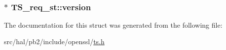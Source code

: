 \subsubsection[{\texorpdfstring{version}{version}}]{$\ast$ T\+S\+\_\+req\+\_\+st\+::version}\hypertarget{struct_t_s__req__st_aa404dd344baaf8d45b951fb6818e0ea6}{}\label{struct_t_s__req__st_aa404dd344baaf8d45b951fb6818e0ea6}


The documentation for this struct was generated from the following file\+:\begin{DoxyCompactItemize}
\item 
src/hal/pb2/include/openssl/\hyperlink{ts_8h}{ts.\+h}\end{DoxyCompactItemize}
